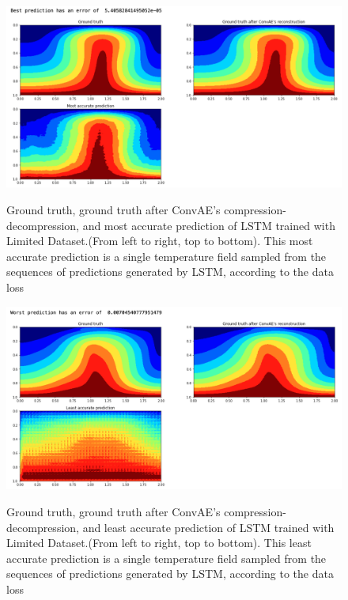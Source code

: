 \begin{figure}[H]
    \caption{Ground truth, ground truth after ConvAE's compression-decompression, and most accurate prediction of LSTM trained with Limited Dataset.(From left to right, top to bottom). This most accurate prediction is a single temperature field sampled from the sequences of predictions generated by LSTM, according to the data loss}
    \includegraphics[scale=0.5]{figures/mantle_convection_images/limited_dataset/LSTM_Best.png}
    \label{figure:LSTM_limited_best}
\end{figure}

\begin{figure}[H]
    \caption{Ground truth, ground truth after ConvAE's compression-decompression, and least accurate prediction of LSTM trained with Limited Dataset.(From left to right, top to bottom). This least accurate prediction is a single temperature field sampled from the sequences of predictions generated by LSTM, according to the data loss}
    \includegraphics[scale=0.5]{figures/mantle_convection_images/limited_dataset/LSTM_Worst.png}
    \label{figure:LSTM_limited_worst}
\end{figure}

